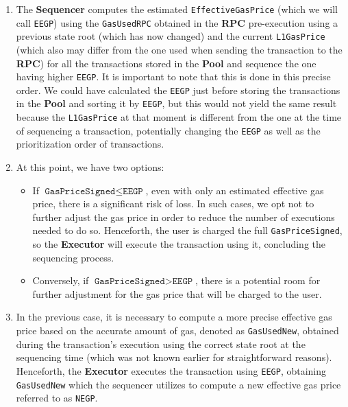 \begin{enumerate}

\item The \textbf{Sequencer} computes the estimated \texttt{EffectiveGasPrice} (which we will call \texttt{EEGP}) using the \texttt{GasUsedRPC} obtained in the \textbf{RPC} pre-execution using a previous state root (which has now changed) and the current \texttt{L1GasPrice} (which also may differ from the one used when sending the transaction to the \textbf{RPC}) for all the transactions stored in the \textbf{Pool} and sequence the one having higher \texttt{EEGP}. It is important to note that this is done in this precise order. We could have calculated the \texttt{EEGP} just before storing the transactions in the \textbf{Pool} and sorting it by \texttt{EEGP}, but this would not yield the same result because the \texttt{L1GasPrice} at that moment is different from the one at the time of sequencing a transaction, potentially changing the \texttt{EEGP} as well as the prioritization order of transactions.

\item At this point, we have two options:

\begin{itemize}

\item If $\texttt{GasPriceSigned} \leq \texttt{EEGP}$, even with only an estimated effective gas price, there is a significant risk of loss. In such cases, we opt not to further adjust the gas price in order to reduce the number of executions needed to do so. Henceforth, the user is charged the full \texttt{GasPriceSigned}, so the \textbf{Executor} will execute the transaction using it, concluding the sequencing process.

\item Conversely, if $\texttt{GasPriceSigned} > \texttt{EEGP}$, there is a potential room for further adjustment for the gas price that will be charged to the user.

\end{itemize}

\item In the previous case, it is necessary to compute a more precise effective gas price based on the accurate amount of gas, denoted as \texttt{GasUsedNew}, obtained during the transaction's execution using the correct state root at the sequencing time (which was not known earlier for straightforward reasons). Henceforth, the \textbf{Executor} executes the transaction using \texttt{EEGP}, obtaining \texttt{GasUsedNew} which the sequencer utilizes to compute a new effective gas price referred to as \texttt{NEGP}.


\end{enumerate}
